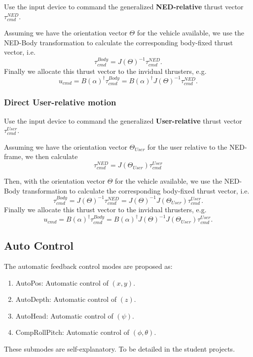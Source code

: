 \documentclass[a4paper,twoside,english]{report}
\begin{document}
Use the input device to command the generalized \textbf{NED-relative}
thrust vector $\tau_{cmd}^{NED}$.

Assuming we have the orientation vector $\Theta$ for the vehicle
available, we use the NED-Body transformation to calculate the corresponding
body-fixed thrust vector, i.e. 
\begin{equation}
\tau_{cmd}^{Body}=J(\Theta)^{-1}\tau_{cmd}^{NED}.
\end{equation}
Finally we allocate this thrust vector to the invidual thrusters,
e.g. 
\begin{equation}
u_{cmd}=B(\alpha)^{\dagger}\tau_{cmd}^{Body}=B(\alpha)^{\dagger}J(\Theta)^{-1}\tau_{cmd}^{NED}.
\end{equation}


\subsubsection{\label{subsec:Direct-User-relative-motion}Direct User-relative motion}

Use the input device to command the generalized \textbf{User-relative}
thrust vector $\tau_{cmd}^{User}$.

Assuming we have the orientation vector $\Theta_{User}$ for the user
relative to the NED-frame, we then calculate 
\begin{equation}
\tau_{cmd}^{NED}=J(\Theta_{User})\tau_{cmd}^{User}
\end{equation}

Then, with the orientation vector $\Theta$ for the vehicle available,
we use the NED-Body transformation to calculate the corresponding
body-fixed thrust vector, i.e. 
\begin{equation}
\tau_{cmd}^{Body}=J(\Theta)^{-1}\tau_{cmd}^{NED}=J(\Theta)^{-1}J(\Theta_{User})\tau_{cmd}^{User}.
\end{equation}
Finally we allocate this thrust vector to the invidual thrusters,
e.g. 
\begin{equation}
u_{cmd}=B(\alpha)^{\dagger}\tau_{cmd}^{Body}=B(\alpha)^{\dagger}J(\Theta)^{-1}J(\Theta_{User})\tau_{cmd}^{User}.
\end{equation}


\subsection{\label{subsec:Auto-Control}Auto Control}

The automatic feedback control modes are proposed as:
\begin{enumerate}
\item AutoPos: Automatic control of $(x,y)$.
\item AutoDepth: Automatic control of $(z)$.
\item AutoHead: Automatic control of $(\psi)$.
\item CompRollPitch: Automatic control of $(\phi,\theta)$. 
\end{enumerate}
These submodes are self-explanatory. To be detailed in the student
projects.
\end{document}
